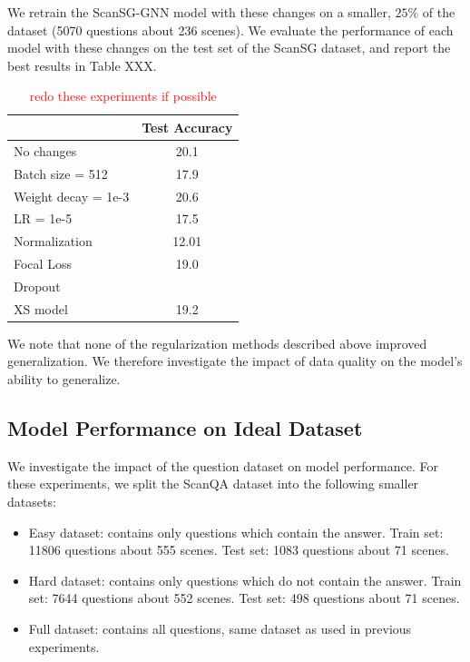 We retrain the ScanSG-GNN model with these changes on a smaller, $25\%$ of the dataset (5070 questions about 236 scenes). We evaluate the performance of each model with these changes on the test set of the ScanSG dataset, and report the best results in Table XXX.

\begin{table}[h!]
    \centering
    \caption{\textcolor{red}{redo these experiments if possible}}
    \begin{tabular}{l|c|}
    \cline{2-2}
                                              & \multicolumn{1}{l|}{\textbf{Test Accuracy}} \\ \hline
    \multicolumn{1}{|l|}{No changes}          & 20.1                                        \\ \hline
    \multicolumn{1}{|l|}{Batch size = 512}    & 17.9                                        \\ \hline
    \multicolumn{1}{|l|}{Weight decay = 1e-3} & 20.6                                        \\ \hline
    \multicolumn{1}{|l|}{LR = 1e-5}           & 17.5                                        \\ \hline
    \multicolumn{1}{|l|}{Normalization}       & 12.01                                       \\ \hline
    \multicolumn{1}{|l|}{Focal Loss}          & 19.0                                        \\ \hline
    \multicolumn{1}{|l|}{Dropout}             &                                             \\ \hline
    \multicolumn{1}{|l|}{XS model}            & 19.2                                        \\ \hline
    \end{tabular}
    \end{table}


We note that none of the regularization methods described above improved generalization. We therefore investigate the impact of data quality on the model's ability to generalize.

\subsection{Model Performance on Ideal Dataset}
We investigate the impact of the question dataset on model performance.
For these experiments, we split the ScanQA dataset into the following smaller datasets:

\begin{itemize}
    \item Easy dataset: contains only questions which contain the answer. Train set: 11806 questions about 555 scenes. Test set: 1083 questions about 71 scenes.
    \item Hard dataset: contains only questions which do not contain the answer. Train set: 7644 questions about 552 scenes. Test set: 498 questions about 71 scenes.
    \item Full dataset: contains all questions, same dataset as used in previous experiments.
\end{itemize}


